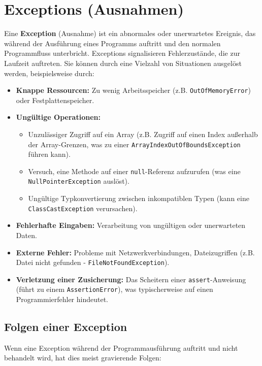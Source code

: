 \chapter{Exceptions (Ausnahmen)}

Eine \textbf{Exception} (Ausnahme) ist ein abnormales oder unerwartetes
Ereignis, das während der Ausführung eines Programms auftritt und den normalen
Programmfluss unterbricht. Exceptions signalisieren Fehlerzustände, die zur
Laufzeit auftreten. Sie können durch eine Vielzahl von Situationen ausgelöst
werden, beispielsweise durch:

\begin{itemize}
    \item \textbf{Knappe Ressourcen:} Zu wenig Arbeitsspeicher (z.B. \texttt{OutOfMemoryError}) oder Festplattenspeicher.
    \item \textbf{Ungültige Operationen:}
          \begin{itemize}
              \item Unzulässiger Zugriff auf ein Array (z.B. Zugriff auf einen Index außerhalb der
                    Array-Grenzen, was zu einer \texttt{ArrayIndexOutOfBoundsException} führen
                    kann).
              \item Versuch, eine Methode auf einer \texttt{null}-Referenz aufzurufen (was eine
                    \texttt{NullPointerException} auslöst).
              \item Ungültige Typkonvertierung zwischen inkompatiblen Typen (kann eine
                    \texttt{ClassCastException} verursachen).
          \end{itemize}
    \item \textbf{Fehlerhafte Eingaben:} Verarbeitung von ungültigen oder unerwarteten Daten.
    \item \textbf{Externe Fehler:} Probleme mit Netzwerkverbindungen, Dateizugriffen (z.B. Datei nicht gefunden - \texttt{FileNotFoundException}).
    \item \textbf{Verletzung einer Zusicherung:} Das Scheitern einer \texttt{assert}-Anweisung (führt zu einem \texttt{AssertionError}), was typischerweise auf einen Programmierfehler hindeutet.
\end{itemize}

\section{Folgen einer Exception}

Wenn eine Exception während der Programmausführung auftritt und nicht behandelt
wird, hat dies meist gravierende Folgen:

